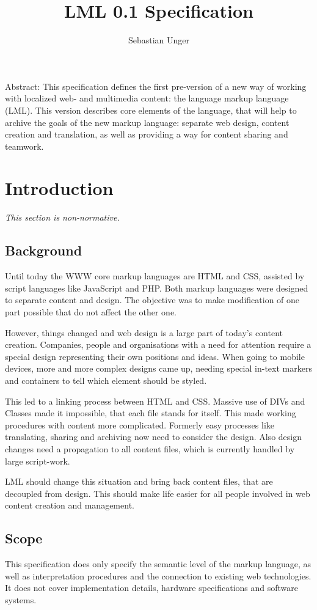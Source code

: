 \documentclass[12pt,a4paper]{article}
\author{Sebastian Unger}
\title{LML 0.1 Specification}
\begin{document}
\maketitle
Abstract: This specification defines the first pre-version of a new way of working with localized web- and multimedia content: the language markup language (LML). This version describes core elements of the language, that will help to archive the goals of the new markup language: separate web design, content creation and translation, as well as providing a way for content sharing and teamwork.
\tableofcontents

\section{Introduction}
\begin{small}\textit{This section is non-normative.}\end{small}

\subsection{Background}
Until today the WWW core markup languages are HTML and CSS, assisted by script languages like JavaScript and PHP. Both markup languages were designed to separate content and design. The objective was to make modification of one part possible that do not affect the other one.

However, things changed and web design is a large part of today's content creation. Companies, people and organisations with a need for attention require a special design representing their own positions and ideas. When going to mobile devices, more and more complex designs came up, needing special in-text markers and containers to tell which element should be styled.

This led to a linking process between HTML and CSS. Massive use of DIVs and Classes made it impossible, that each file stands for itself. This made working procedures with content more complicated. Formerly easy processes like translating, sharing and archiving now need to consider the design. Also design changes need a propagation to all content files, which is currently handled by large script-work.

LML should change this situation and bring back content files, that are decoupled from design. This should make life easier for all people involved in web content creation and management.

\subsection{Scope}
This specification does only specify the semantic level of the markup language, as well as interpretation procedures and the connection to existing web technologies. It does not cover implementation details, hardware specifications and software systems.
\end{document}
